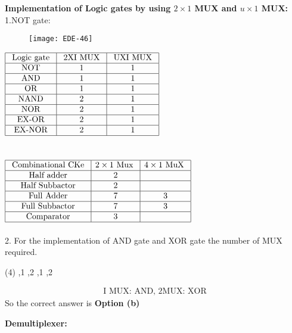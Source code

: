 \textbf{Implementation of Logic gates by using $2 \times 1$ MUX and $u \times 1$ MUX:}\\
1.\quad NOT gate:
\begin{figure}[H]
	\centering
	\texttt{[image: EDE-46]}
\end{figure}
\renewcommand*{\arraystretch}{1.5}
$\begin{array}{|c|c|c|}
\hline\text { Logic gate } & \text { 2XI MUX } & \text { UXI MUX } \\
\hline \text { NOT } & 1 & 1 \\
\hline \text { AND } & 1 & 1 \\
\hline \text { OR } & 1 & 1 \\
\hline \text { NAND } & 2 & 1\\
\hline \text { NOR } & 2 & 1\\
\hline \text { EX-OR } & 2 & 1\\
\hline \text { EX-NOR } & 2 & 1\\	\hline
\end{array}$\\\\\\
$\begin{array}{|c|c|c|}
\hline\text { Combinational CKe } & 2 \times 1 \text { Mux } & 4 \times 1 \text { MuX } \\
\hline \text { Half adder } & 2 & \\
\hline \text { Half Subbactor } & 2 & \\
\hline \text { Full Adder } & 7 & 3\\
\hline \text { Full Subbactor } & 7 & 3\\
\hline \text { Comparator } & 3 &  \\\hline
\end{array}$\\\\
2. \quad For the implementation of AND gate and XOR gate the number of MUX required.
\begin{tasks}(4)
	,1
	,2
	,1
	,2
\end{tasks}
\begin{answer}
	\begin{align*}
	\text { I MUX: AND, 2MUX: XOR }
	\end{align*}
	So the correct answer is \textbf{Option (b)}
\end{answer}
\textbf{Demultiplexer:}\\
